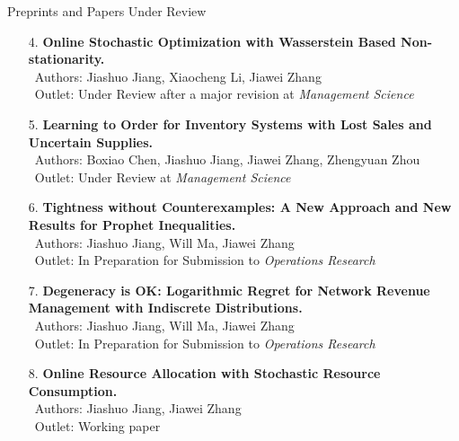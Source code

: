 \documentclass{resume} %
\begin{document}
\begin{rSection}{Preprints and Papers Under Review}

\begin{enumerate}

\item[4.] \textbf{Online Stochastic Optimization with Wasserstein Based Non-stationarity.}\label{P2} \\
\small
 \ Authors: Jiashuo Jiang, Xiaocheng Li, Jiawei Zhang \\
 \ Outlet: Under Review after a major revision at \textit{Management Science}
\normalsize

\item[5.] \textbf{Learning to Order for Inventory Systems with Lost Sales and Uncertain Supplies.}\label{P7} \\
\small
 \ Authors: Boxiao Chen, Jiashuo Jiang, Jiawei Zhang, Zhengyuan Zhou \\
 \ Outlet: Under Review at \textit{Management Science}
\normalsize

\item[6.] \textbf{Tightness without Counterexamples: A New Approach and New Results for Prophet Inequalities.}\label{P6} \\
\small
 \ Authors: Jiashuo Jiang, Will Ma, Jiawei Zhang \\
 \ Outlet: In Preparation for Submission to \textit{Operations Research}
\normalsize

\item[7.] \textbf{Degeneracy is OK: Logarithmic Regret for Network Revenue Management with Indiscrete Distributions.}\label{P8} \\
\small
 \ Authors: Jiashuo Jiang, Will Ma, Jiawei Zhang \\
 \ Outlet: In Preparation for Submission to \textit{Operations Research}
\normalsize

\item[8.] \textbf{Online Resource Allocation with Stochastic Resource Consumption.}\label{P4} \\
\small
 \ Authors: Jiashuo Jiang, Jiawei Zhang \\
 \ Outlet: Working paper
\normalsize

\end{enumerate}

\end{rSection}
\vspace{0.3cm}
\end{document}
